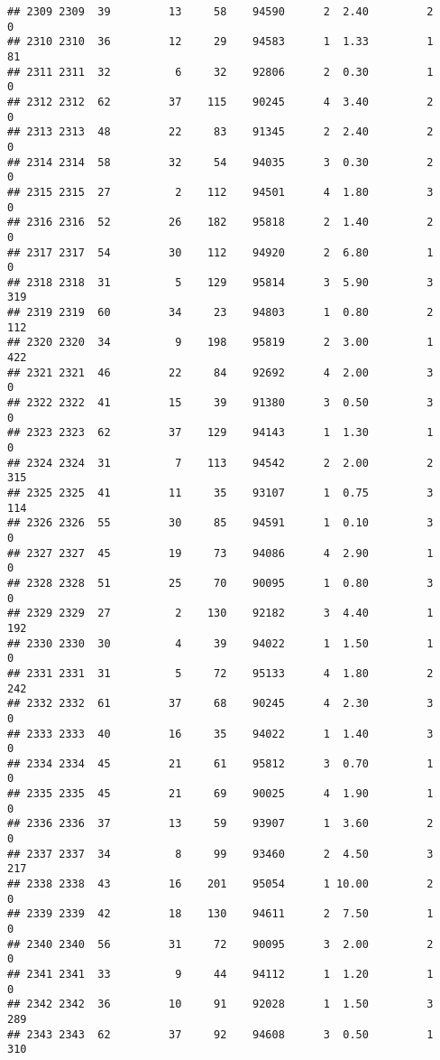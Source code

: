 \documentclass[
]{article}
\begin{document}
\begin{verbatim}
## 2309 2309  39         13     58    94590      2  2.40         2        0
## 2310 2310  36         12     29    94583      1  1.33         1       81
## 2311 2311  32          6     32    92806      2  0.30         1        0
## 2312 2312  62         37    115    90245      4  3.40         2        0
## 2313 2313  48         22     83    91345      2  2.40         2        0
## 2314 2314  58         32     54    94035      3  0.30         2        0
## 2315 2315  27          2    112    94501      4  1.80         3        0
## 2316 2316  52         26    182    95818      2  1.40         2        0
## 2317 2317  54         30    112    94920      2  6.80         1        0
## 2318 2318  31          5    129    95814      3  5.90         3      319
## 2319 2319  60         34     23    94803      1  0.80         2      112
## 2320 2320  34          9    198    95819      2  3.00         1      422
## 2321 2321  46         22     84    92692      4  2.00         3        0
## 2322 2322  41         15     39    91380      3  0.50         3        0
## 2323 2323  62         37    129    94143      1  1.30         1        0
## 2324 2324  31          7    113    94542      2  2.00         2      315
## 2325 2325  41         11     35    93107      1  0.75         3      114
## 2326 2326  55         30     85    94591      1  0.10         3        0
## 2327 2327  45         19     73    94086      4  2.90         1        0
## 2328 2328  51         25     70    90095      1  0.80         3        0
## 2329 2329  27          2    130    92182      3  4.40         1      192
## 2330 2330  30          4     39    94022      1  1.50         1        0
## 2331 2331  31          5     72    95133      4  1.80         2      242
## 2332 2332  61         37     68    90245      4  2.30         3        0
## 2333 2333  40         16     35    94022      1  1.40         3        0
## 2334 2334  45         21     61    95812      3  0.70         1        0
## 2335 2335  45         21     69    90025      4  1.90         1        0
## 2336 2336  37         13     59    93907      1  3.60         2        0
## 2337 2337  34          8     99    93460      2  4.50         3      217
## 2338 2338  43         16    201    95054      1 10.00         2        0
## 2339 2339  42         18    130    94611      2  7.50         1        0
## 2340 2340  56         31     72    90095      3  2.00         2        0
## 2341 2341  33          9     44    94112      1  1.20         1        0
## 2342 2342  36         10     91    92028      1  1.50         3      289
## 2343 2343  62         37     92    94608      3  0.50         1      310

\end{verbatim}
\end{document}
